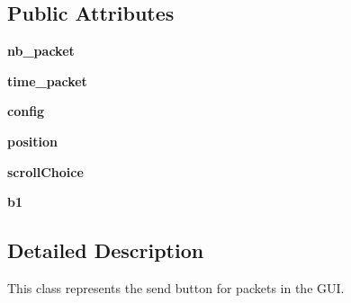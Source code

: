 \subsection*{Public Attributes}
\begin{DoxyCompactItemize}
\item 
\hypertarget{classButon_1_1SendButton_a7bc6a511ddbcf41ccbed4ac614ba0468}{{\bfseries nb\+\_\+packet}}\label{classButon_1_1SendButton_a7bc6a511ddbcf41ccbed4ac614ba0468}

\item 
\hypertarget{classButon_1_1SendButton_a3bd82e242aaecbf324ef942df421fc44}{{\bfseries time\+\_\+packet}}\label{classButon_1_1SendButton_a3bd82e242aaecbf324ef942df421fc44}

\item 
\hypertarget{classButon_1_1SendButton_a2656c3901a73a4cb5c18fce1bd21b084}{{\bfseries config}}\label{classButon_1_1SendButton_a2656c3901a73a4cb5c18fce1bd21b084}

\item 
\hypertarget{classButon_1_1SendButton_aac10ab96693715e0d580b06317c0fd73}{{\bfseries position}}\label{classButon_1_1SendButton_aac10ab96693715e0d580b06317c0fd73}

\item 
\hypertarget{classButon_1_1SendButton_a40b300924f62fb795bb73f228f2bdb24}{{\bfseries scroll\+Choice}}\label{classButon_1_1SendButton_a40b300924f62fb795bb73f228f2bdb24}

\item 
\hypertarget{classButon_1_1SendButton_afda17ea3319bda160d36bab86e9d35b0}{{\bfseries b1}}\label{classButon_1_1SendButton_afda17ea3319bda160d36bab86e9d35b0}

\end{DoxyCompactItemize}


\subsection{Detailed Description}
This class represents the send button for packets in the G\+U\+I. 


